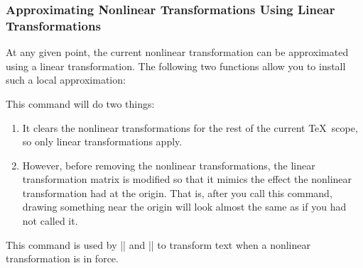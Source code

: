 \subsubsection{Approximating Nonlinear Transformations Using Linear Transformations}

At any given point, the current nonlinear transformation can be approximated
using a linear transformation. The following two functions allow you to install
such a local approximation:

\begin{command}{\pgfapproximatenonlineartransformation}
    This command will do two things:
    \begin{enumerate}
        \item It clears the nonlinear transformations for the rest of the
            current \TeX\ scope, so only linear transformations apply.
        \item However, before removing the nonlinear transformations, the
            linear transformation matrix is modified so that it mimics the
            effect the nonlinear transformation had at the origin. That is,
            after you call this command, drawing something near the origin will
            look almost the same as if you had not called it.
    \end{enumerate}
\begin{codeexample}[preamble={\usepgfmodule{nonlineartransformations}}]
\end{codeexample}
    This command is used by |\pgftext| and |\pgfnode| to transform text when a
    nonlinear transformation is in force.
\end{command}

